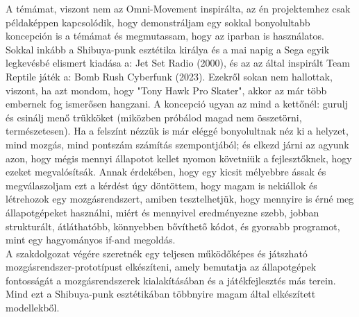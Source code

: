 A témámat, viszont nem az Omni-Movement inspirálta, az én projektemhez csak példaképpen kapcsolódik, hogy demonstráljam egy sokkal bonyolultabb koncepción is a témámat és megmutassam, hogy az iparban is használatos. Sokkal inkább a Shibuya-punk esztétika\cite{Yoko2023} királya és a mai napig a Sega egyik legkevésbé elismert kiadása a: Jet Set Radio (2000), és az az által inspirált Team Reptile játék a: Bomb Rush Cyberfunk (2023). Ezekről sokan nem hallottak, viszont, ha azt mondom, hogy "Tony Hawk Pro Skater", akkor az már több embernek fog ismerősen hangzani. A koncepció ugyan az mind a kettőnél: gurulj és csinálj menő trükköket (miközben próbálod magad nem összetörni, természetesen). Ha a felszínt nézzük is már eléggé bonyolultnak néz ki a helyzet, mind mozgás, mind pontszám számítás szempontjából; és elkezd  járni az agyunk azon, hogy mégis mennyi állapotot kellet nyomon követniük a fejlesztőknek, hogy ezeket megvalósítsák. Annak érdekében, hogy egy kicsit mélyebbre ássak és megválaszoljam ezt a kérdést úgy döntöttem, hogy magam is nekiállok és létrehozok egy mozgásrendszert, amiben tesztelhetjük, hogy mennyire is érné meg állapotgépeket használni, miért és mennyivel eredményezne szebb, jobban strukturált, átláthatóbb, könnyebben bővíthető kódot, és gyorsabb programot, mint egy hagyományos if-and megoldás.\\

A szakdolgozat végére szeretnék egy teljesen működőképes és játszható mozgásrendszer-prototípust elkészíteni, amely bemutatja az állapotgépek fontosságát a mozgásrendszerek kialakításában és a játékfejlesztés más terein. Mind ezt a Shibuya-punk esztétikában többnyire magam által elkészített modellekből.\\